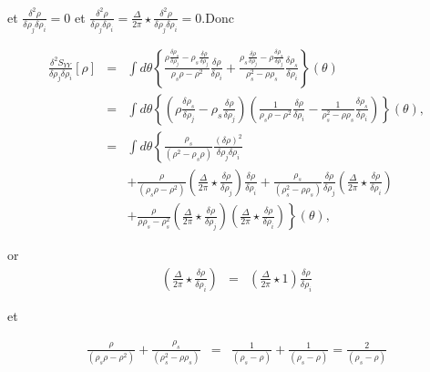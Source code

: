 	et $\frac{\delta^2 \rho}{\delta \rho_j\delta \rho_i} =0 $ et $\frac{\delta^2 \rho}{\delta \rho_j\delta \rho_i} = \frac{\Delta}{2\pi} \star \frac{\delta^2 \rho}{\delta \rho_j\delta \rho_i} = 0 $.Donc 
	
	\begin{eqnarray}
		\frac{ \delta^2 S_{YY} }{ \delta \rho_j\delta \rho_i } [\rho ]  & = &\int  d\theta\left \{ \frac{\rho \frac{\delta \rho_s}{\delta \rho_j}- \rho_s\frac{\delta \rho}{\delta \rho_j}}{\rho_s\rho -\rho^2 }\frac{\delta \rho}{\delta \rho_i}  + \frac{\rho_s \frac{\delta \rho}{\delta \rho_j}- \rho\frac{\delta \rho_s}{\delta \rho_j}}{\rho_s^2 - \rho\rho_s}\frac{\delta \rho_s}{\delta \rho_i} \right \}(\theta) \\	
		& = & 	\int  d\theta\left \{ \left ( \rho \frac{\delta \rho_s}{\delta \rho_j}- \rho_s\frac{\delta \rho}{\delta \rho_j} \right ) \left ( \frac{1}{\rho_s\rho -\rho^2 }\frac{\delta \rho}{\delta \rho_i}  - \frac{1}{\rho_s^2 - \rho\rho_s}\frac{\delta \rho_s}{\delta \rho_i} \right )  \right \}(\theta),\\
		& = & \int  d\theta\left \{  \frac{\rho_s}{(\rho^2  - \rho_s\rho)} \frac{(\delta \rho)^2}{\delta \rho_j \delta \rho_i} \right . \\
		&  &  +  \left . \frac{\rho }{(\rho_s\rho -\rho^2) } \left (  \frac{\Delta}{2\pi} \star\frac{\delta \rho}{\delta \rho_j}   \right ) \frac{\delta \rho}{\delta \rho_i}+ \frac{\rho_s }{( \rho_s^2 - \rho \rho_s) }\frac{\delta \rho}{\delta \rho_j} \left (  \frac{\Delta}{2\pi} \star\frac{\delta \rho}{\delta \rho_i} \right )  \right . \\
		& & + \left .  \frac{\rho }{\rho\rho_s - \rho_s^2 }\left (  \frac{\Delta}{2\pi} \star\frac{\delta \rho}{\delta \rho_j} \right )\left (  \frac{\Delta}{2\pi} \star\frac{\delta \rho}{\delta \rho_i} \right )  \right \}(\theta),
	\end{eqnarray}
	
	or 
	\begin{eqnarray}
		\left (  \frac{\Delta}{2\pi} \star\frac{\delta \rho}{\delta \rho_i} \right ) & = & \left (  \frac{\Delta}{2\pi} \star 1  \right )	\frac{\delta \rho}{\delta \rho_i} 
	\end{eqnarray}
	
	et 
	
	\begin{eqnarray}
		\frac{\rho }{(\rho_s\rho -\rho^2) } + \frac{\rho_s }{( \rho_s^2 - \rho \rho_s) } & = & 	\frac{1}{(\rho_s -\rho) } + 	\frac{1}{( \rho_s - \rho ) } = \frac{2}{( \rho_s - \rho ) }
	\end{eqnarray}
	

